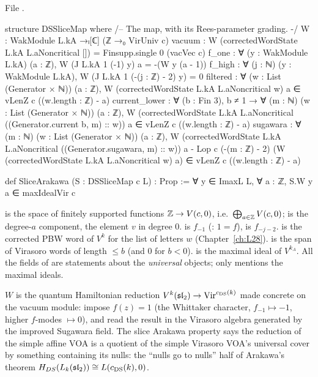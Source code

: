 \noindent File .
\begin{leancode}
structure DSSliceMap where
  /-- The map, with its Rees-parameter grading. -/
  W : WakModule L.kA →ₗ[ℂ] (ℤ →₀ VirUniv c)
  vacuum : W (correctedWordState L.kA L.aNoncritical []) = Finsupp.single 0 (vacVec c)
  f_one : ∀ (y : WakModule L.kA) (a : ℤ), W (J L.kA 1 (-1) y) a = -(W y (a - 1))
  f_high : ∀ (j : ℕ) (y : WakModule L.kA), W (J L.kA 1 (-(j : ℤ) - 2) y) = 0
  filtered : ∀ (w : List (Generator × ℕ)) (a : ℤ),
    W (correctedWordState L.kA L.aNoncritical w) a ∈ vLenZ c ((w.length : ℤ) - a)
  current_lower : ∀ (b : Fin 3), b ≠ 1 → ∀ (m : ℕ) (w : List (Generator × ℕ)) (a : ℤ),
    W (correctedWordState L.kA L.aNoncritical ((Generator.current b, m) :: w)) a ∈
      vLenZ c ((w.length : ℤ) - a)
  sugawara : ∀ (m : ℕ) (w : List (Generator × ℕ)) (a : ℤ),
    W (correctedWordState L.kA L.aNoncritical ((Generator.sugawara, m) :: w)) a -
      Lop c (-(m : ℤ) - 2) (W (correctedWordState L.kA L.aNoncritical w) a) ∈
        vLenZ c ((w.length : ℤ) - a)

def SliceArakawa (S : DSSliceMap c L) : Prop :=
  ∀ y ∈ ImaxL L, ∀ a : ℤ, S.W y a ∈ maxIdealVir c
\end{leancode}

\begin{dictionary}
 is the space of finitely supported functions ${\mathbb{Z}}\to V(c,0)$, i.e.\ $\bigoplus_{a\in{\mathbb{Z}}}V(c,0)$;
 is the degree-$a$ component,  the element $v$ in degree $0$. 
is $f_{-1}$ (: $1=f$),  is $f_{-j-2}$.  is the
corrected PBW word of $V^k$ for the list of letters $w$ (Chapter~\ref{ch:L28}).  is the span of
Virasoro words of length $\le b$ (and $0$ for $b<0$).  is the maximal ideal of $V^{k_A}$. All the fields
of  are statements about the \emph{universal} objects; only  mentions the maximal
ideals.
\end{dictionary}

\begin{physics}
$W$ is the quantum Hamiltonian reduction $V^k(\mathfrak{sl}_2)\to\mathrm{Vir}^{c_{\mathrm{DS}}(k)}$ made concrete on the
vacuum module: impose $f(z)=1$ (the Whittaker character, $f_{-1}\mapsto-1$, higher $f$-modes $\mapsto0$), and read the
result in the Virasoro algebra generated by the improved Sugawara field. The slice Arakawa property says the reduction
of the simple affine VOA is a quotient of the simple Virasoro VOA's universal cover by something containing its nulls:
the ``nulls go to nulls'' half of Arakawa's theorem $H_{DS}(L_k(\mathfrak{sl}_2))\cong L(c_{\mathrm{DS}}(k),0)$.
\end{physics}

